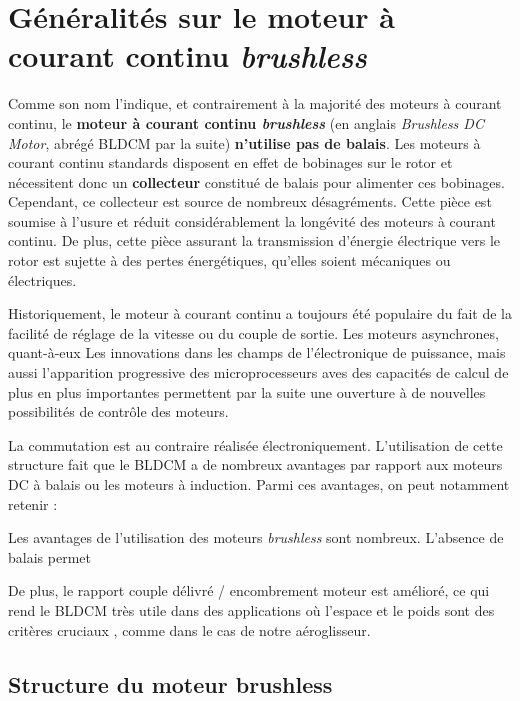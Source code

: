 \documentclass[a4paper,12pt]{book}
\begin{document}
		\section{Généralités sur le moteur à courant continu \textit{brushless}}
			
		Comme son nom l'indique, et contrairement à la majorité des moteurs à courant continu, le \textbf{moteur à courant continu \textit{brushless}} (en anglais \textit{Brushless DC Motor}, abrégé BLDCM par la suite) \textbf{n'utilise pas de balais}. Les moteurs à courant continu standards disposent en effet de bobinages sur le rotor et nécessitent donc un \textbf{collecteur} constitué de balais pour alimenter ces bobinages. Cependant, ce collecteur est source de nombreux désagréments. Cette pièce est soumise à l'usure et réduit considérablement la longévité des moteurs à courant continu. De plus, cette pièce assurant la transmission d'énergie électrique vers le rotor est sujette à des pertes énergétiques, qu'elles soient mécaniques ou électriques. 
		
		Historiquement, le moteur à courant continu a toujours été populaire du fait de la facilité de réglage de la vitesse ou du couple de sortie. Les moteurs asynchrones, quant-à-eux Les innovations dans les champs de l'électronique de puissance, mais aussi l'apparition progressive des microprocesseurs aves des capacités de calcul de plus en plus importantes permettent par la suite une ouverture à de nouvelles possibilités de contrôle des moteurs. 
		
		
		
		
	
	
	 La commutation est au contraire réalisée électroniquement. L'utilisation de cette structure fait que le BLDCM a de nombreux avantages par rapport aux moteurs DC à balais ou les moteurs à induction. Parmi ces avantages, on peut notamment retenir :
			
			
		Les avantages de l'utilisation des moteurs \textit{brushless} sont nombreux. L'absence de balais permet 
	
			
			De plus, le rapport couple délivré / encombrement moteur est amélioré, ce qui rend le BLDCM très utile dans des applications où l'espace et le poids sont des critères cruciaux \cite{AN885}, comme dans le cas de notre aéroglisseur.
			
	
			
			\subsection{Structure du moteur brushless}
			
\end{document}

